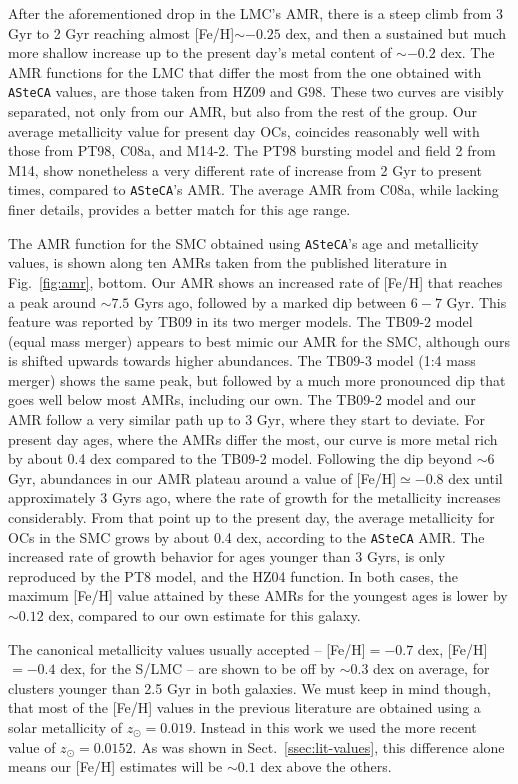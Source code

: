 \documentclass{aa}
\begin{document}
%
After the aforementioned drop in the LMC's AMR, there is a steep climb from 3
Gyr to 2 Gyr reaching almost [Fe/H]${\sim-}0.25$ dex, and then a sustained but
much more shallow increase up to the present day's metal content of ${\sim-}0.2$
dex. The AMR functions for the LMC that differ the most from the one obtained
with \texttt{ASteCA} values, are those taken from HZ09 and G98. These two curves
are visibly separated, not only from our AMR, but also from the rest of the
group.
Our average metallicity value for present day OCs, coincides reasonably well
with those from PT98, C08a, and M14-2. The PT98 bursting model and field 2
from M14, show nonetheless a very different rate of increase from 2 Gyr to
present times, compared to \texttt{ASteCA}'s AMR. The average AMR from C08a,
while lacking finer details, provides a better match for this age range.

%
The AMR function for the SMC obtained using \texttt{ASteCA}'s age and
metallicity values, is shown along ten AMRs taken from the published literature
in Fig.~\ref{fig:amr}, bottom.
%
Our AMR shows an increased rate of [Fe/H] that reaches a peak around
${\sim}7.5$ Gyrs ago, followed by a marked dip between $6{-}7$ Gyr.
This feature was reported by TB09 in its two merger models.
The TB09-2 model (equal mass merger) appears to best mimic our AMR for the SMC,
although ours is shifted upwards towards higher abundances. The TB09-3 model 
(1:4 mass merger) shows the same peak, but followed by a much more pronounced
dip that goes well below most AMRs, including our own.
%
The TB09-2 model and our AMR follow a very similar path up to 3 Gyr,
where they start to deviate. For present day ages, where the AMRs differ the
most, our curve is more metal rich by about 0.4 dex compared to the TB09-2
model.
%
Following the dip beyond ${\sim}6$ Gyr, abundances in our AMR plateau around a
value of [Fe/H]${\simeq-}0.8$ dex until approximately 3 Gyrs ago, where the
rate of growth for the metallicity increases considerably. From that point up to
the present day, the average metallicity for OCs in the SMC grows by about 0.4
dex, according to the \texttt{ASteCA} AMR.
%
The increased rate of growth behavior for ages younger than 3 Gyrs, is only
reproduced by the PT8 model, and the HZ04 function. In both cases, the maximum 
[Fe/H] value attained by these AMRs for the youngest ages is lower by
${\sim}0.12$ dex, compared to our own estimate for this galaxy.

The canonical metallicity values usually accepted -- [Fe/H]${=-0.7}$ dex,
[Fe/H]${=-}0.4$ dex, for the S/LMC -- are shown to be off by ${\sim0.3}$ dex on
average, for clusters younger than 2.5 Gyr in both galaxies. We must keep in
mind though, that most of the [Fe/H] values in the previous literature are
obtained using a solar metallicity of $z_{\odot}{=}0.019$. Instead in this work
we used the more recent value of $z_{\odot}{=}0.0152$. As was shown in
Sect.~\ref{ssec:lit-values}, this difference alone means our [Fe/H] estimates
will be ${\sim}0.1$ dex above the others.
\end{document}
